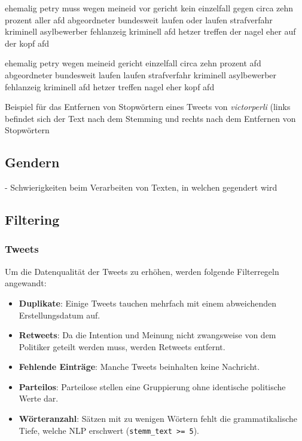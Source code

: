 \begin{code}[H]
    \begin{minipage}{0.45\textwidth}
        \small
        ehemalig petry muss wegen meineid vor gericht kein einzelfall gegen circa zehn prozent aller afd abgeordneter bundesweit laufen oder laufen strafverfahr kriminell asylbewerber fehlanzeig kriminell afd hetzer treffen der nagel eher auf der kopf afd
    \end{minipage}\hfill
    \begin{minipage}{0.45\textwidth}
        \small
        ehemalig petry wegen meineid gericht einzelfall circa zehn prozent afd abgeordneter bundesweit laufen laufen strafverfahr kriminell asylbewerber fehlanzeig kriminell afd hetzer treffen nagel eher kopf afd
    \end{minipage}\hfill
    \caption[Beispiel -- Entfernen von Stopwörtern]{Beispiel für das Entfernen von Stopwörtern eines Tweets von \textit{victorperli} (links befindet sich der Text nach dem Stemming und rechts nach dem Entfernen von Stopwörtern} \label{list:stopwords}
\end{code}

\subsection{Gendern} \label{subsec:gendering}

- Schwierigkeiten beim Verarbeiten von Texten, in welchen gegendert wird

\subsection{Filtering} \label{subsec:filtering}

\subsubsection{Tweets}

Um die Datenqualität der Tweets zu erhöhen, werden folgende Filterregeln angewandt:

\begin{itemize}
    \item \textbf{Duplikate}: Einige Tweets tauchen mehrfach mit einem abweichenden Erstellungsdatum auf.
    \item \textbf{Retweets}: Da die Intention und Meinung nicht zwangsweise von dem Politiker geteilt werden muss, werden Retweets entfernt.
    \item \textbf{Fehlende Einträge}: Manche Tweets beinhalten keine Nachricht.
    \item \textbf{Parteilos}: Parteilose stellen eine Gruppierung ohne identische politische Werte dar.
    \item \textbf{Wörteranzahl}: Sätzen mit zu wenigen Wörtern fehlt die grammatikalische Tiefe, welche \ac{NLP} erschwert (\texttt{stemm\_text >= 5}).
\end{itemize}

